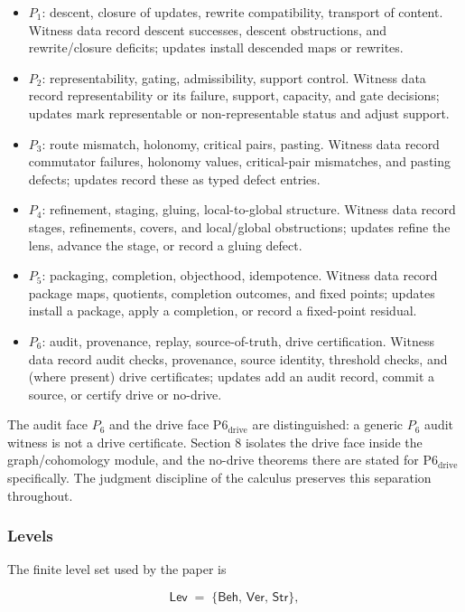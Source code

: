 \documentclass[11pt]{article}
\providecommand{\tightlist}{}
\theoremstyle{definition}
\begin{document}
\begin{itemize}
\tightlist
\item
  \(P_1\): descent, closure of updates, rewrite compatibility, transport of content. Witness data record descent successes, descent obstructions, and rewrite/closure deficits; updates install descended maps or rewrites.
\item
  \(P_2\): representability, gating, admissibility, support control. Witness data record representability or its failure, support, capacity, and gate decisions; updates mark representable or non-representable status and adjust support.
\item
  \(P_3\): route mismatch, holonomy, critical pairs, pasting. Witness data record commutator failures, holonomy values, critical-pair mismatches, and pasting defects; updates record these as typed defect entries.
\item
  \(P_4\): refinement, staging, gluing, local-to-global structure. Witness data record stages, refinements, covers, and local/global obstructions; updates refine the lens, advance the stage, or record a gluing defect.
\item
  \(P_5\): packaging, completion, objecthood, idempotence. Witness data record package maps, quotients, completion outcomes, and fixed points; updates install a package, apply a completion, or record a fixed-point residual.
\item
  \(P_6\): audit, provenance, replay, source-of-truth, drive certification. Witness data record audit checks, provenance, source identity, threshold checks, and (where present) drive certificates; updates add an audit record, commit a source, or certify drive or no-drive.
\end{itemize}

The audit face \(P_6\) and the drive face \(\mathrm{P6}_{\mathrm{drive}}\) are distinguished: a generic \(P_6\) audit witness is not a drive certificate. Section 8 isolates the drive face inside the graph/cohomology module, and the no-drive theorems there are stated for \(\mathrm{P6}_{\mathrm{drive}}\) specifically. The judgment discipline of the calculus preserves this separation throughout.

\subsubsection{Levels}

The finite level set used by the paper is

\[
\mathsf{Lev} \;=\; \{\mathsf{Beh},\,\mathsf{Ver},\,\mathsf{Str}\},
\]
\end{document}
